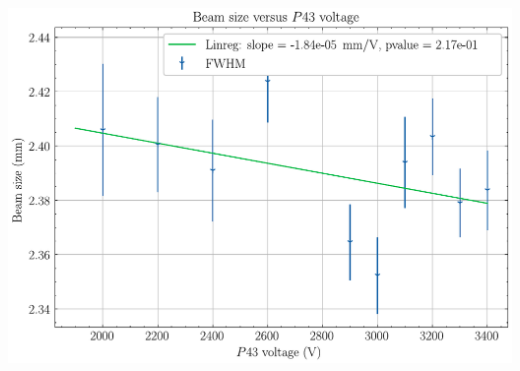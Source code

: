 \begin{frame}
\begin{columns}[T]
\begin{column}{0.45\textwidth}
      \includegraphics[width=1\textwidth]{04_Test/fig/fig000_P43_size}
    \end{column}
  \end{columns}
\end{frame}

